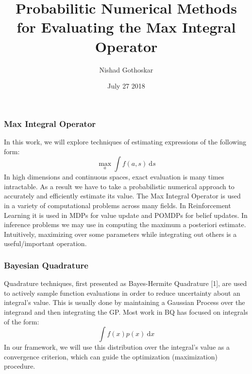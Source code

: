 \documentclass[9pt]{beamer}
\title{Probabilitic Numerical Methods for Evaluating the Max Integral Operator}
\author{Nishad Gothoskar}
\institute{Learning and Intelligent Systems}
\date{July 27 2018}
\begin{document}
 
\frame{\titlepage}
 
\begin{frame}
\frametitle{Max Integral Operator}
In this work, we will explore techniques of estimating expressions of the following form:
\begin{equation*}
    \max_{a} \int f(a,s) \ \text{d}s
\end{equation*}
In high dimensions and continuous spaces, exact evaluation is many times intractable. As a result we have to take a probabilistic numerical approach to accurately and efficiently estimate its value.
\newline \newline
The Max Integral Operator is used in a variety of computational problems across many fields. In 
Reinforcement Learning it is used in MDPs for value update and POMDPs for belief updates. In inference problems we may use in computing the maximum a posteriori estimate. Intuitively, maximizing over some parameters while integrating out others is a useful/important operation.
\end{frame}

\begin{frame}
\frametitle{Bayesian Quadrature}
Quadrature techniques, first presented as Bayes-Hermite Quadrature [1], are used to actively sample function evaluations in order to reduce uncertainty about an integral's value. This is usually done by maintaining a Gaussian Process over the integrand and then integrating the GP. 
\newline\newline
Most work in BQ has focused on integrals of the form:
\begin{equation*}
   \int f(x) p(x)  \ \text{d}x
\end{equation*}
In our framework, we will use this distribution over the integral's value as a convergence criterion, which can guide the optimization (maximization) procedure.
\end{frame}

\end{document}
